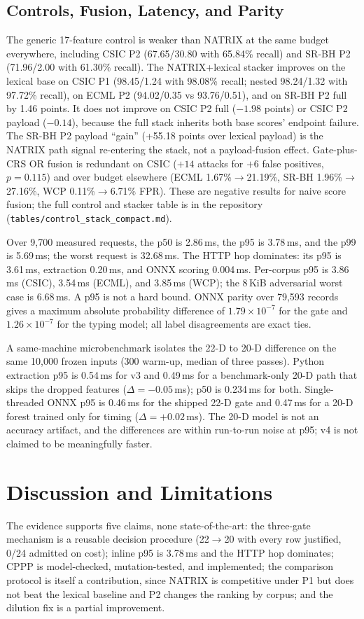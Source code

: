 \documentclass[conference]{IEEEtran}
\begin{document}
\subsection{Controls, Fusion, Latency, and Parity}
The generic 17-feature control is weaker than NATRIX at the same budget everywhere, including CSIC P2 (67.65/30.80 with 65.84\% recall) and SR-BH P2 (71.96/2.00 with 61.30\% recall). The NATRIX+lexical stacker improves on the lexical base on CSIC P1 (98.45/1.24 with 98.08\% recall; nested 98.24/1.32 with 97.72\% recall), on ECML P2 (94.02/0.35 vs 93.76/0.51), and on SR-BH P2 full by 1.46 points. It does not improve on CSIC P2 full ($-1.98$ points) or CSIC P2 payload ($-0.14$), because the full stack inherits both base scores' endpoint failure. The SR-BH P2 payload ``gain'' (+55.18 points over lexical payload) is the NATRIX path signal re-entering the stack, not a payload-fusion effect. Gate-plus-CRS OR fusion is redundant on CSIC ($+14$ attacks for $+6$ false positives, $p=0.115$) and over budget elsewhere (ECML 1.67\%$\to$21.19\%, SR-BH 1.96\%$\to$27.16\%, WCP 0.11\%$\to$6.71\% FPR). These are negative results for naive score fusion; the full control and stacker table is in the repository (\texttt{tables/control\_stack\_compact.md}).

Over 9,700 measured requests, the p50 is 2.86\,ms, the p95 is 3.78\,ms, and the p99 is 5.69\,ms; the worst request is 32.68\,ms. The HTTP hop dominates: its p95 is 3.61\,ms, extraction 0.20\,ms, and ONNX scoring 0.004\,ms. Per-corpus p95 is 3.86\,ms (CSIC), 3.54\,ms (ECML), and 3.85\,ms (WCP); the 8\,KiB adversarial worst case is 6.68\,ms. A p95 is not a hard bound. ONNX parity over 79,593 records gives a maximum absolute probability difference of $1.79\times10^{-7}$ for the gate and $1.26\times10^{-7}$ for the typing model; all label disagreements are exact ties.

A same-machine microbenchmark isolates the 22-D to 20-D difference on the same 10,000 frozen inputs (300 warm-up, median of three passes). Python extraction p95 is 0.54\,ms for v3 and 0.49\,ms for a benchmark-only 20-D path that skips the dropped features ($\Delta=-0.05$\,ms); p50 is 0.234\,ms for both. Single-threaded ONNX p95 is 0.46\,ms for the shipped 22-D gate and 0.47\,ms for a 20-D forest trained only for timing ($\Delta=+0.02$\,ms). The 20-D model is not an accuracy artifact, and the differences are within run-to-run noise at p95; v4 is not claimed to be meaningfully faster.

\section{Discussion and Limitations}
\label{sec:discussion}
The evidence supports five claims, none state-of-the-art: the three-gate mechanism is a reusable decision procedure (22$\rightarrow$20 with every row justified, 0/24 admitted on cost); inline p95 is 3.78\,ms and the HTTP hop dominates; CPPP is model-checked, mutation-tested, and implemented; the comparison protocol is itself a contribution, since NATRIX is competitive under P1 but does not beat the lexical baseline and P2 changes the ranking by corpus; and the dilution fix is a partial improvement.
\end{document}
